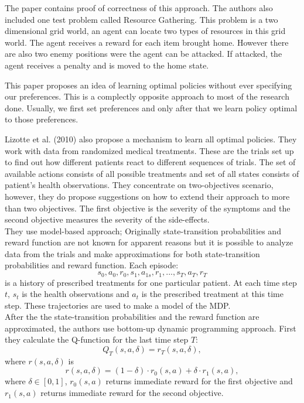 The paper contains proof of correctness of this approach. The authors also included one test problem called Resource Gathering. This problem is a two dimensional grid world, an agent can locate two types of resources in this grid world. The agent receives a reward for each item brought home. However there are also two enemy positions were the agent can be attacked. If attacked, the agent receives a penalty and is moved to the home state.

This paper proposes an idea of learning optimal policies without ever specifying our preferences. This is a complectly opposite approach to most of the research done. Usually, we first set preferences and only after that we learn policy optimal to those preferences.

Lizotte et al. (2010) \nocite{lizotte2010efficient} also propose a mechanism to learn all optimal policies. They work with data from randomized medical treatments. These are the trials set up to find out how different patients react to different sequences of trials. The set of available actions consists of all possible treatments and set of all states consists of patient's health observations. They concentrate on two-objectives scenario, however, they do propose suggestions on how to extend their approach to more than two objectives. The first objective is the severity of the symptoms and the second objective measures the severity of the side-effects. \\

They use model-based approach; Originally state-transition probabilities and reward function are not known for apparent reasons but it is possible to analyze data from the trials and make approximations for both state-transition probabilities and reward function. Each episode:
$$ s_{0},a_{0},r_{0},s_{1},a_{1s},r_{1}, ... , s_{T},a_{T},r_{T} $$
is a history of prescribed treatments for one particular patient. At each time step $t$, $s_{t}$ is the health observations and $a_{t}$ is the prescribed treatment at this time step. These trajectories are used to make a model of the MDP. \\

After the the state-transition probabilities and the reward function are approximated, the authors use bottom-up dynamic programming approach. First they calculate the Q-function for the last time step $T$:
$$ Q_{T}(s,a,\delta) = r_{T}(s,a,\delta), $$
where $r(s,a,\delta)$ is
$$ r(s,a,\delta) = (1 - \delta) \cdot r_{0}(s,a) + \delta \cdot r_{1}(s,a), $$
where $ \delta \in [0,1] $, $ r_{0}(s,a) $ returns immediate reward for the first objective and $ r_{1}(s,a) $ returns immediate reward for the second objective. \\

